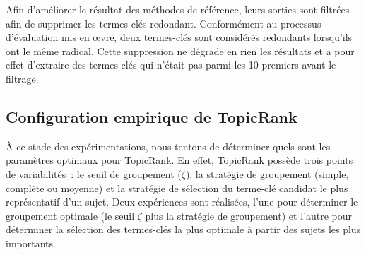       Afin d'améliorer le résultat des méthodes de référence, leurs sorties sont
      filtrées afin de supprimer les termes-clés redondant. Conformément au
      processus d'évaluation mis en \oe{}vre, deux termes-clés sont considérés
      redondants lorsqu'ils ont le même radical. Cette suppression ne dégrade en
      rien les résultats et a pour effet d'extraire des termes-clés qui n'était
      pas parmi les 10 premiers avant le filtrage.

  \subsection{Configuration empirique de TopicRank}
  \label{subsection:configuration_empirique_de_topicrank}
    À ce stade des expérimentations, nous tentons de déterminer quels sont les
    paramètres optimaux pour TopicRank. En effet, TopicRank possède trois points
    de variabilités~: le seuil de groupement ($\zeta$), la stratégie de
    groupement (simple, complète ou moyenne) et la stratégie de sélection du
    terme-clé candidat le plus représentatif d'un sujet. Deux expériences sont
    réalisées, l'une pour déterminer le groupement optimale (le seuil $\zeta$
    plus la stratégie de groupement) et l'autre pour déterminer la sélection des
    termes-clés la plus optimale à partir des sujets les plus importants.

